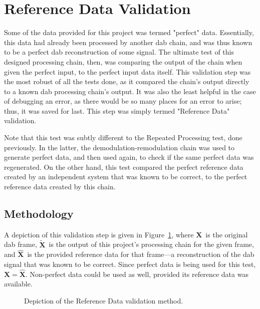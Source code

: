 \documentclass[class=report,11pt,crop=false]{standalone}
\begin{document}
\section{Reference Data Validation}
Some of the data provided for this project was termed "perfect" data. Essentially, this data had already been processed by another \gls{dab} chain, and was thus known to be a perfect \gls{dab} reconstruction of some signal. The ultimate test of this designed processing chain, then, was comparing the output of the chain when given the perfect input, to the perfect input data itself. This validation step was the most robust of all the tests done, as it compared the chain's output directly to a known \gls{dab} processing chain's output. It was also the least helpful in the case of debugging an error, as there would be so many places for an error to arise; thus, it was saved for last.  This step was simply termed "Reference Data" validation.

Note that this test was subtly different to the Repeated Processing test, done previously. In the latter, the demodulation-remodulation chain was used to generate perfect data, and then used again, to check if the same perfect data was regenerated. On the other hand, this test compared the perfect reference data created by an independent system that was known to be correct, to the perfect reference data created by this chain.

\subsection{Methodology}
A depiction of this validation step is given in Figure~\ref{fig:reference-data-validation}, where \(\mathbf{X}\)~is the original \gls{dab} frame, \(\mathbf{\tilde{X}}\)~is the output of this project's processing chain for the given frame, and \(\mathbf{\hat{X}}\)~is the provided reference data for that frame---a reconstruction of the \gls{dab} signal that was known to be correct. Since perfect data is being used for this test, \(\mathbf{X=\hat{X}}\). Non-perfect data could be used as well, provided its reference data was available.

\begin{figure}[htbp]
  \centering
  \captionsetup{type=figure}
  \def\svgwidth{\linewidth}
  { %
      }
  \caption{Depiction of the Reference Data validation method.}
  \label{fig:reference-data-validation}
\end{figure}
\end{document}

